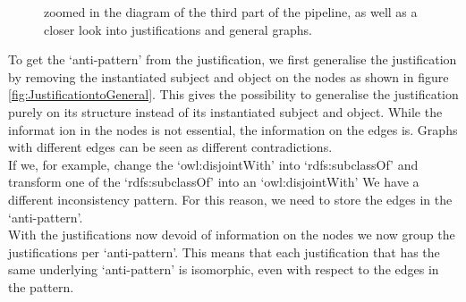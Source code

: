\documentclass[11pt,letterpaper ,oneside ]{book}
\begin{document}
\begin{figure}[!t]
	\hfill
	\caption{zoomed in the diagram of the third part of the pipeline, as well as a closer look into justifications and general graphs.}
	\label{fig:PipelinePart3}
\end{figure}
To get the `anti-pattern' from the justification, we first generalise the justification by removing the instantiated subject and object on the nodes as shown in figure \ref{fig:JustificationtoGeneral}. This gives the possibility to generalise the justification purely on its structure instead of its instantiated subject and object. While the informat
ion in the nodes is not essential, the information on the edges is. Graphs with different edges can be seen as different contradictions. \\
If we, for example, change the `owl:disjointWith' into `rdfs:subclassOf' and transform one of the `rdfs:subclassOf' into an `owl:disjointWith' We have a different inconsistency pattern. For this reason, we need to store the edges in the `anti-pattern'.\\
With the justifications now devoid of information on the nodes we now group the justifications per `anti-pattern'. This means that each justification that has the same underlying `anti-pattern' is isomorphic, even with respect to the edges in the pattern. \\
\end{document}
